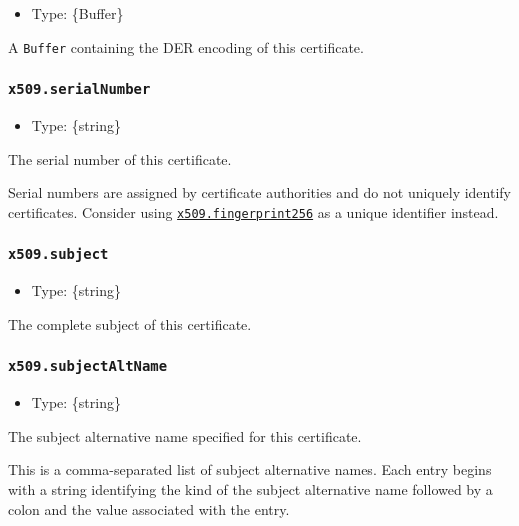 \begin{itemize}
\tightlist
\item
  Type: \{Buffer\}
\end{itemize}

A \texttt{Buffer} containing the DER encoding of this certificate.

\subsubsection{\texorpdfstring{\texttt{x509.serialNumber}}{x509.serialNumber}}\label{x509.serialnumber}

\begin{itemize}
\tightlist
\item
  Type: \{string\}
\end{itemize}

The serial number of this certificate.

Serial numbers are assigned by certificate authorities and do not
uniquely identify certificates. Consider using
\hyperref[x509fingerprint256]{\texttt{x509.fingerprint256}} as a unique
identifier instead.

\subsubsection{\texorpdfstring{\texttt{x509.subject}}{x509.subject}}\label{x509.subject}

\begin{itemize}
\tightlist
\item
  Type: \{string\}
\end{itemize}

The complete subject of this certificate.

\subsubsection{\texorpdfstring{\texttt{x509.subjectAltName}}{x509.subjectAltName}}\label{x509.subjectaltname}

\begin{itemize}
\tightlist
\item
  Type: \{string\}
\end{itemize}

The subject alternative name specified for this certificate.

This is a comma-separated list of subject alternative names. Each entry
begins with a string identifying the kind of the subject alternative
name followed by a colon and the value associated with the entry.


